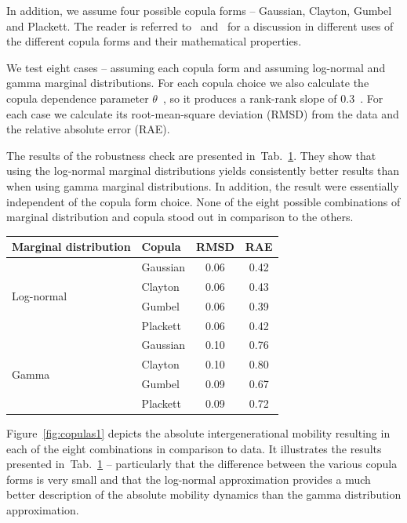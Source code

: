 \documentclass[12pt,a4paper]{article}
\newcommand{\ra}[1]{\renewcommand{\arraystretch}{#1}}
\newcommand{\Fref}[1]{Figure~\ref{fig:#1}}
\newcommand{\tlabel}[1]{\label{tab:#1}}
\newcommand{\tref}[1]{Tab.~\ref{tab:#1}}
\numberwithin{equation}{section}
\begin{document}
In addition, we assume four possible copula forms -- Gaussian, Clayton, Gumbel and Plackett. The reader is referred to~\citet{trivedi2007copula} and~\citet{bonhomme2009assessing} for a discussion in different uses of the different copula forms and their mathematical properties.

We test eight cases -- assuming each copula form and assuming log-normal and gamma marginal distributions. For each copula choice we also calculate the copula dependence parameter $\theta$~\citep{trivedi2007copula}, so it produces a rank-rank slope of $0.3$~\citep{chetty2014land}. For each case we calculate its root-mean-square deviation (RMSD) from the data and the relative absolute error (RAE).

The results of the robustness check are presented in~\tref{robust}. They show that using the log-normal marginal distributions yields consistently better results than when using gamma marginal distributions. In addition, the result were essentially independent of the copula form choice. None of the eight possible combinations of marginal distribution and copula stood out in comparison to the others.

\begin{table}[!htb]
\ra{1.1}
\centering
{}\tlabel{robust}
\begin{tabular}{@{}llcc@{}}\toprule[1.5pt]
Marginal distribution & Copula & RMSD & RAE\\
\midrule[1.5pt]
\multirow{ 4}{*}{Log-normal}
& Gaussian & 0.06 & 0.42\\
& Clayton & 0.06 & 0.43\\
& Gumbel &  0.06 & 0.39\\
& Plackett & 0.06 & 0.42\\
\midrule[1.5pt]
\multirow{ 4}{*}{Gamma}
& Gaussian  & 0.10 & 0.76\\
& Clayton  & 0.10 & 0.80\\
& Gumbel  & 0.09 & 0.67\\
& Plackett & 0.09 & 0.72\\
\bottomrule[1.5pt]
\end{tabular}
\end{table}

\Fref{copulas1} depicts the absolute intergenerational mobility resulting in each of the eight combinations in comparison to data. It illustrates the results presented in~\tref{robust} -- particularly that the difference between the various copula forms is very small and that the log-normal approximation provides a much better description of the absolute mobility dynamics than the gamma distribution approximation.
\end{document}
